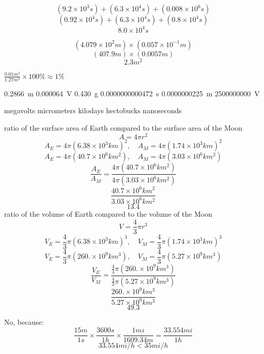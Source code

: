 \documentclass[11pt,largemargins]{homework}
\begin{document}
\question
$$  ( 9.2 \times 10^3 s ) + ( 6.3 \times 10^4 s ) + ( 0.008 \times 10^6 s ) $$
$$  ( 0.92 \times 10^4 s ) + ( 6.3 \times 10^4 s ) + ( 0.8 \times 10^4 s ) $$
$$ \boxed{8.0 \times 10^4 s}  $$

\question
$$ (4.079 \times 10^2 m) \times (0.057 \times 10^{-1} m) $$
$$ (407.9 m) \times (0.0057  m) $$
$$ \boxed{2.3m^2} $$

\question
$ \frac{0.01m^2}{1.27m^2} \times 100\% \approx \boxed{1\%} $

\setcounter{questionCounter}{13}
\question
  \begin{alphaparts}
    \questionpart \SI{0.2866}{\meter}
    \questionpart \SI{0.000064}{\volt}
    \questionpart \SI{0.430}{\gram}
    \questionpart \SI{0.0000000000472}{\second}
    \questionpart \SI{0.0000000225}{\meter}
    \questionpart \SI{2500000000}{\volt}
  \end{alphaparts}

\question
  \begin{alphaparts}
     megavolts
     micrometers
     kilodays
     hectobucks 
     nanoseconds
  \end{alphaparts}

\setcounter{questionCounter}{16}
\question
  \begin{alphaparts}
    \questionpart ratio of the surface area of Earth compared to the surface area of the Moon
      $$ A = 4 \pi r^2 $$
      $$ A_E = 4 \pi (6.38 \times 10^3 km)^2, \quad A_M = 4 \pi (1.74 \times 10^3 km)^2   $$ 
      $$ A_E = 4 \pi (40.7 \times 10^6 km^2), \quad A_M = 4 \pi (3.03 \times 10^6 km^2) $$
      $$ \frac{A_E}{A_M} = \frac{4 \pi (40.7 \times 10^6 km^2)}{4 \pi (3.03 \times 10^6 km^2)} $$
      $$ \frac{40.7 \times 10^6 km^2}{3.03 \times 10^6 km^2} $$
      $$ \boxed{13.4} $$
    \questionpart ratio of the volume of Earth compared to the volume of the Moon
      $$ V = \frac{4}{3} \pi r^3 $$
      $$ V_E = \frac{4}{3} \pi (6.38 \times 10^3 km)^3, \quad V_M = \frac{4}{3} \pi (1.74 \times 10^3 km)^3  $$
      $$ V_E = \frac{4}{3} \pi (260. \times 10^9 km^3), \quad V_M = \frac{4}{3} \pi (5.27 \times 10^9 km^3) $$
      $$ \frac{V_E}{V_M} = \frac{\frac{4}{3} \pi (260. \times 10^9 km^3)}{\frac{4}{3} \pi (5.27 \times 10^9 km^3)} $$
      $$ \frac{260. \times 10^9 km^3}{5.27 \times 10^9 km^3} $$
      $$ \boxed{49.3} $$
  \end{alphaparts}

\question
No, because:
$$ \frac{15m}{1s} \times \frac{3600s}{1h} \times \frac{1mi}{1609.34m} = \frac{33.554mi}{1h} $$
$$ 33.554 mi/h < 35 mi/h $$
\end{document}
